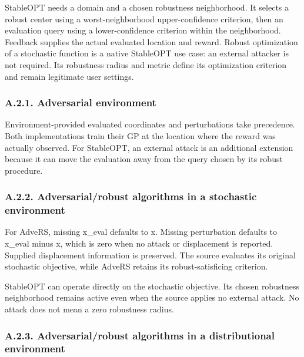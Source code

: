 \documentclass[10pt,a4paper]{article}
\begin{document}
StableOPT needs a domain and a chosen robustness neighborhood. It selects a robust center using a worst-neighborhood upper-confidence criterion,\allowbreak{} then an evaluation query using a lower-confidence criterion within the neighborhood. Feedback supplies the actual evaluated location and reward. Robust optimization of a stochastic function is a native StableOPT use case: an external attacker is not required. Its robustness radius and metric define its optimization criterion and remain legitimate user settings.


\subsubsection*{A.2.1. Adversarial environment}

Environment-provided evaluated coordinates and perturbations take precedence. Both implementations train their GP at the location where the reward was actually observed. For StableOPT,\allowbreak{} an external attack is an additional extension because it can move the evaluation away from the query chosen by its robust procedure.


\subsubsection*{A.2.2. Adversarial/robust algorithms in a stochastic environment}

For AdveRS,\allowbreak{} missing x\_\allowbreak{}eval defaults to x. Missing perturbation defaults to x\_\allowbreak{}eval minus x,\allowbreak{} which is zero when no attack or displacement is reported. Supplied displacement information is preserved. The source evaluates its original stochastic objective,\allowbreak{} while AdveRS retains its robust-satisficing criterion.


StableOPT can operate directly on the stochastic objective. Its chosen robustness neighborhood remains active even when the source applies no external attack. No attack does not mean a zero robustness radius.


\subsubsection*{A.2.3. Adversarial/robust algorithms in a distributional environment}
\end{document}
